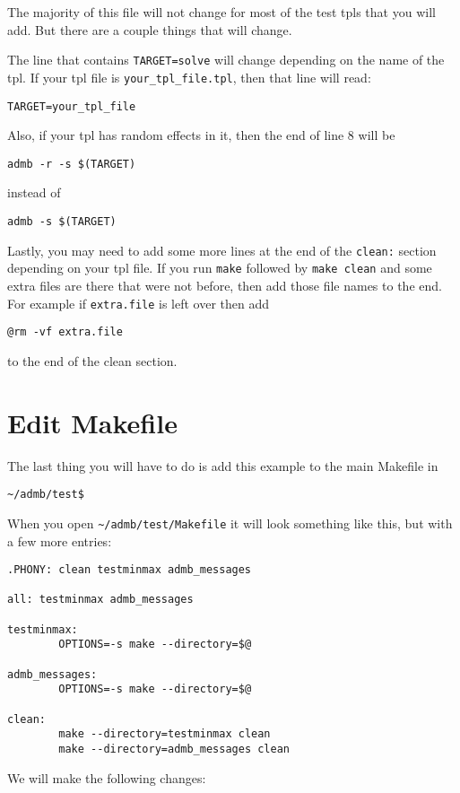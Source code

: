 \documentclass{article}
\begin{document}
The majority of this file will not change for most of the test tpls that you
will add. But there are a couple things that will change.

The line that contains \verb"TARGET=solve" will change depending on the name of the tpl.
If your tpl file is \verb"your_tpl_file.tpl", then that line will read:
\begin{verbatim}
TARGET=your_tpl_file
\end{verbatim}

Also, if your tpl has random effects in it, then the end of line 8 will be
\begin{verbatim}
admb -r -s $(TARGET)
\end{verbatim}
instead of
\begin{verbatim}
admb -s $(TARGET)
\end{verbatim}

Lastly, you may need to add some more lines at the end of the \verb"clean:" section
depending on your tpl file. If you run \verb"make" followed by \verb"make clean" and
some extra files are there that were not before, then add those file names to the end.
For example if \verb"extra.file" is left over then add
\begin{verbatim}
@rm -vf extra.file
\end{verbatim}
to the end of the clean section.

\section{Edit Makefile}

The last thing you will have to do is add this example to the main Makefile in
\begin{verbatim}
~/admb/test$
\end{verbatim}

When you open \verb"~/admb/test/Makefile" it will look something like this, but with a few more entries:
\begin{verbatim}
.PHONY: clean testminmax admb_messages 

all: testminmax admb_messages

testminmax:
        OPTIONS=-s make --directory=$@

admb_messages:
        OPTIONS=-s make --directory=$@

clean:
        make --directory=testminmax clean
        make --directory=admb_messages clean
\end{verbatim}

We will make the following changes:
\end{document}
